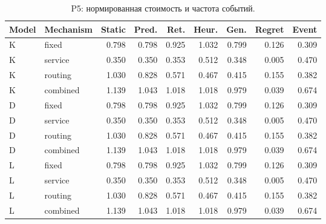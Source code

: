 \begin{table}[htbp]\caption{P5: нормированная стоимость и частота событий.}\centering\small\setlength{\tabcolsep}{3pt}

\begin{tabular}{llrrrrrrr}\toprule

Model & Mechanism & Static & Pred. & Ret. & Heur. & Gen. & Regret & Event\\\midrule

K & fixed & 0.798 & 0.798 & 0.925 & 1.032 & 0.799 & 0.126 & 0.309\\

K & service & 0.350 & 0.350 & 0.353 & 0.512 & 0.348 & 0.005 & 0.470\\

K & routing & 1.030 & 0.828 & 0.571 & 0.467 & 0.415 & 0.155 & 0.382\\

K & combined & 1.139 & 1.043 & 1.018 & 1.018 & 0.979 & 0.039 & 0.674\\

D & fixed & 0.798 & 0.798 & 0.925 & 1.032 & 0.799 & 0.126 & 0.309\\

D & service & 0.350 & 0.350 & 0.353 & 0.512 & 0.348 & 0.005 & 0.470\\

D & routing & 1.030 & 0.828 & 0.571 & 0.467 & 0.415 & 0.155 & 0.382\\

D & combined & 1.139 & 1.043 & 1.018 & 1.018 & 0.979 & 0.039 & 0.674\\

L & fixed & 0.798 & 0.798 & 0.925 & 1.032 & 0.799 & 0.126 & 0.309\\

L & service & 0.350 & 0.350 & 0.353 & 0.512 & 0.348 & 0.005 & 0.470\\

L & routing & 1.030 & 0.828 & 0.571 & 0.467 & 0.415 & 0.155 & 0.382\\

L & combined & 1.139 & 1.043 & 1.018 & 1.018 & 0.979 & 0.039 & 0.674\\

\bottomrule\end{tabular}\end{table}

